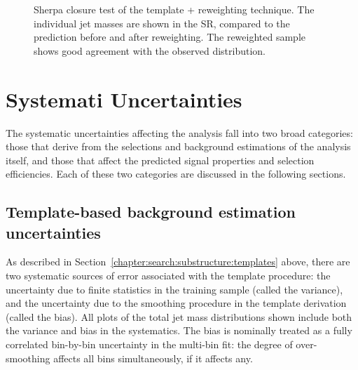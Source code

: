 \begin{figure}[!ht]
  \centering
  
    
  \caption{Sherpa closure test of the template + reweighting technique. The individual jet masses are shown in the SR, compared to the prediction before and after reweighting. The reweighted sample shows good agreement with the observed distribution.}
               
  \label{fig:search:search:mccheck:4jSherpa}
\end{figure}



\section{Systemati Uncertainties}


The systematic uncertainties affecting the analysis fall into two broad categories: those that derive from the selections and background estimations of the analysis itself, and those that affect the predicted signal properties and selection efficiencies. Each of these two categories are discussed in the following sections.

\subsection{Template-based background estimation uncertainties}


As described in Section~\ref{chapter:search:substructure:templates} above, there are two systematic sources of error associated with the template procedure: the uncertainty due to finite statistics in the training sample (called the variance), and the uncertainty due to the smoothing procedure in the template derivation (called the bias). All plots of the total jet mass distributions shown include both the variance and bias in the systematics. The bias is nominally treated as a fully correlated bin-by-bin uncertainty in the multi-bin fit: the degree of over-smoothing affects all bins simultaneously, if it affects any.

